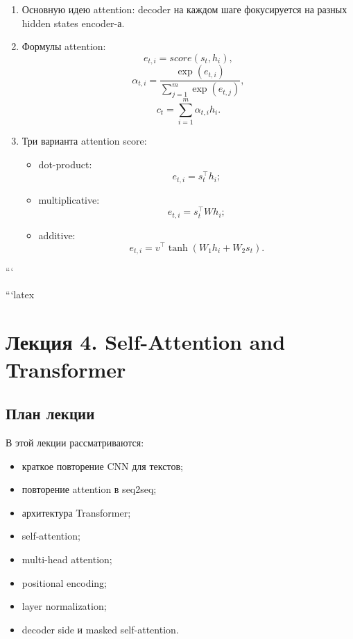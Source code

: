\documentclass[a4paper,12pt]{article}
\begin{document}
\begin{enumerate}
    \item Основную идею attention:
    decoder на каждом шаге фокусируется на разных hidden states encoder-а.

    \item Формулы attention:
    \[
    e_{t,i} = score(s_t, h_i),
    \]
    \[
    \alpha_{t,i}
    =
    \frac{\exp(e_{t,i})}
    {\sum_{j=1}^{m}\exp(e_{t,j})},
    \]
    \[
    c_t
    =
    \sum_{i=1}^{m}
    \alpha_{t,i}h_i.
    \]

    \item Три варианта attention score:
    \begin{itemize}
        \item dot-product:
        \[
        e_{t,i}=s_t^\top h_i;
        \]

        \item multiplicative:
        \[
        e_{t,i}=s_t^\top W h_i;
        \]

        \item additive:
        \[
        e_{t,i}
        =
        v^\top
        \tanh(W_1h_i + W_2s_t).
        \]
    \end{itemize}
\end{enumerate}
```


```latex
\section{Лекция 4. Self-Attention and Transformer}

\subsection{План лекции}

В этой лекции рассматриваются:

\begin{itemize}
    \item краткое повторение CNN для текстов;
    \item повторение attention в seq2seq;
    \item архитектура Transformer;
    \item self-attention;
    \item multi-head attention;
    \item positional encoding;
    \item layer normalization;
    \item decoder side и masked self-attention.
\end{itemize}
\end{document}
